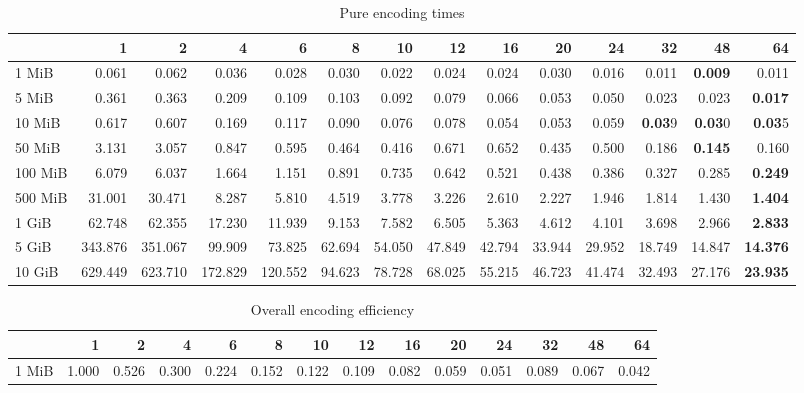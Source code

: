 \begin{centering}
\begin{table}[!h]
\end{table}
\begin{table}[!h]
	\caption{Pure encoding times}
	\begin{tabular}{lrrrrrrrrrrrrr}
		\toprule
		\diagbox[width=7em]{Size}{Threads}  &      1  &      2  &      4  &      6  &     8  &     10 &     12 &     16 &     20 &     24 &     32 &     48 &     64 \\
		\midrule
		1 MiB   &   0.061 &   0.062 &   0.036 &   0.028 &  0.030 &  0.022 &  0.024 &  0.024 &  0.030 &  0.016 &  0.011 &  \textbf{0.009} &  0.011 \\
		5 MiB   &   0.361 &   0.363 &   0.209 &   0.109 &  0.103 &  0.092 &  0.079 &  0.066 &  0.053 &  0.050 &  0.023 &  0.023 &  \textbf{0.017} \\
		10 MiB  &   0.617 &   0.607 &   0.169 &   0.117 &  0.090 &  0.076 &  0.078 &  0.054 &  0.053 &  0.059 &  \textbf{0.03}9 &  \textbf{0.03}0 &  \textbf{0.03}5 \\
		50 MiB  &   3.131 &   3.057 &   0.847 &   0.595 &  0.464 &  0.416 &  0.671 &  0.652 &  0.435 &  0.500 &  0.186 &  \textbf{0.145} &  0.160 \\
		100 MiB &   6.079 &   6.037 &   1.664 &   1.151 &  0.891 &  0.735 &  0.642 &  0.521 &  0.438 &  0.386 &  0.327 &  0.285 &  \textbf{0.249} \\
		500 MiB &  31.001 &  30.471 &   8.287 &   5.810 &  4.519 &  3.778 &  3.226 &  2.610 &  2.227 &  1.946 &  1.814 &  1.430 &  \textbf{1.404} \\
		1 GiB   &  62.748 &  62.355 &  17.230 &  11.939 &  9.153 &  7.582 &  6.505 &  5.363 &  4.612 &  4.101 &  3.698 &  2.966 &  \textbf{2.833} \\
		5 GiB   & 343.876 & 351.067 &  99.909 &  73.825 & 62.694 & 54.050 & 47.849 & 42.794 & 33.944 & 29.952 & 18.749 & 14.847 & \textbf{14.376} \\
		10 GiB  & 629.449 & 623.710 & 172.829 & 120.552 & 94.623 & 78.728 & 68.025 & 55.215 & 46.723 & 41.474 & 32.493 & 27.176 & \textbf{23.935} \\
		\bottomrule
	\end{tabular}
\end{table}
\begin{table}[!h]
	\caption{Overall encoding efficiency}
	\begin{tabular}{lrrrrrrrrrrrrr}
		\toprule
		\diagbox[width=7em]{Size}{Threads}&    1  &    2  &    4  &    6  &    8  &    10 &    12 &    16 &    20 &    24 &    32 &    48 &    64 \\
		\midrule
		1 MiB   & 1.000 & 0.526 & 0.300 & 0.224 & 0.152 & 0.122 & 0.109 & 0.082 & 0.059 & 0.051 & 0.089 & 0.067 & 0.042 \\

\end{tabular}
\end{table}
\end{centering}

